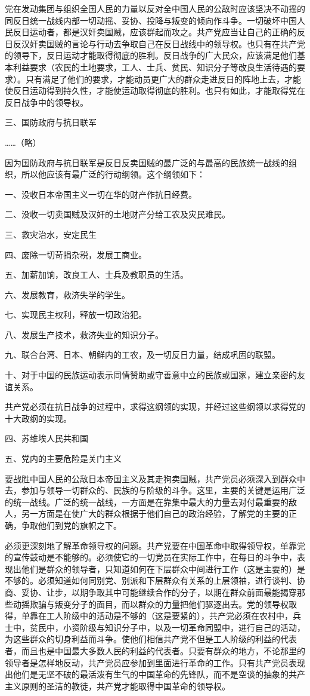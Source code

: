 党在发动集团与组织全国人民的力量以反对全中国人民的公敌时应该坚决不动摇的同反日统一战线内部一切动摇、妥协、投降与叛变的倾向作斗争。一切破坏中国人民反日运动者，都是汉奸卖国贼，应该群起而攻之。共产党应当让自己的正确的反日反汉奸卖国贼的言论与行动去争取自己在反日战线中的领导权。也只有在共产党的领导下，反日运动才能取得彻底的胜利。反日战争的广大民众，应该满足他们基本利益要求（农民的土地要求，工人、士兵、贫民、知识分子等改良生活待遇的要求）。只有满足了他们的要求，才能动员更广大的群众走进反日的阵地上去，才能使反日运动得到持久性，才能使运动取得彻底的胜利。也只有如此，才能取得党在反日战争中的领导权。

三、国防政府与抗日联军

……（略）

因为国防政府与抗日联军是反日反卖国贼的最广泛的与最高的民族统一战线的组织，所以他应该有最广泛的行动纲领。这个纲领如下：

一、没收日本帝国主义一切在华的财产作抗日经费。

二、没收一切卖国贼及汉奸的土地财产分给工农及灾民难民。

三、救灾治水，安定民生

四、废除一切苛捐杂税，发展工商业。

五、加薪加饷，改良工人、士兵及教职员的生活。

六、发展教育，救济失学的学生。

七、实现民主权利，释放一切政治犯。

八、发展生产技术，救济失业的知识分子。

九、联合台湾、日本、朝鲜内的工农，及一切反日力量，结成巩固的联盟。

十、对于中国的民族运动表示同情赞助或守善意中立的民族或国家，建立亲密的友谊关系。

共产党必须在抗日战争的过程中，求得这纲领的实现，并经过这些纲领以求得党的十大政纲的实现。

四、苏维埃人民共和国

五、党内的主要危险是关门主义

要战胜中国人民的公敌日本帝国主义及其走狗卖国贼，共产党员必须深入到群众中去，参加与领导一切群众的、民族的与阶级的斗争。这里，主要的关键是运用广泛的统一战线。广泛的统一战线，一方面是在靠集中最大的力量去对付最重要的敌人，另一方面是在使广大的群众根据于他们自己的政治经验，了解党的主要的正确，争取他们到党的旗帜之下。

必须更深刻地了解革命领导权的问题。共产党要在中国革命中取得领导权，单靠党的宣传鼓动是不能够的。必须使它的一切党员在实际工作中，在每日的斗争中，表现出他们是群众的领导者，只知道如何在下层群众中间进行工作（这是主要的）是不够的。必须知道如何同别党、别派和下层群众有关系的上层领袖，进行谈判、协商、妥协、让步，以期争取其中可能继续合作的分子，以期在群众前面最能揭穿那些动摇欺骗与叛变分子的面目，而以群众的力量把他们驱逐出去。党的领导权取得，单靠在工人阶级中的活动是不够的（这是要紧的），共产党必须在农村中，兵士中，贫民中，小资阶级与知识分子中，以及一切革命同盟中，进行自己的活动，为这些群众的切身利益而斗争。使他们相信共产党不但是工人阶级的利益的代表者，而且也是中国最大多数人民的利益的代表者。只要有群众的地方，不论那里的领导者是怎样地反动，共产党员应参加到里面进行革命的工作。只有共产党员表现出他们是无坚不破的最活泼有生气的中国革命的先锋队，而不是空谈的抽象的共产主义原则的圣洁的教徒，共产党才能取得中国革命的领导权。

